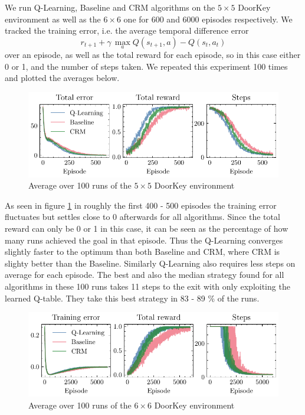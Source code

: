 \documentclass[12pt, a4paper]{article}
\begin{document}
We run Q-Learning, Baseline and CRM algorithms on the $5 \times 5$ DoorKey environment as well as the $6 \times 6$ one for 600 and 6000 episodes respectively. We tracked the training error, i.e. the average temporal difference error $$r_{t+1} + \gamma \, \max_a Q(s_{t+1}, a) - Q(s_t, a_t)$$ over an episode, as well as the total reward for each episode, so in this case either 0 or 1, and the number of steps taken. We repeated this experiment 100 times and plotted the averages below.

\begin{figure}[ht!]
	\centering
	\includegraphics[width=\textwidth]{figures/cmp1_5x5.pdf}
	\caption{Average over 100 runs of the $5 \times 5$ DoorKey environment}
	\label{fig:5x5_1}
\end{figure}

As seen in figure \ref{fig:5x5_1} in roughly the first 400 - 500 episodes the training error fluctuates but settles close to 0 afterwards for all algorithms. Since the total reward can only be 0 or 1 in this case, it can be seen as the percentage of how many runs achieved the goal in that episode. Thus the Q-Learning converges slightly faster to the optimum than both Baseline and CRM, where CRM is slighty better than the Baseline. Similarly Q-Learning also requires less steps on average for each episode. The best and also the median strategy found for all algorithms in these 100 runs takes 11 steps to the exit with only exploiting the learned Q-table. They take this best strategy in 83 - 89 \% of the runs.

\begin{figure}[ht!]
	\centering
	\includegraphics[width=\textwidth]{figures/cmp1_6x6.pdf}
	\caption{Average over 100 runs of the $6 \times 6$ DoorKey environment}
	\label{fig:6x6_1}
\end{figure}
\end{document}
